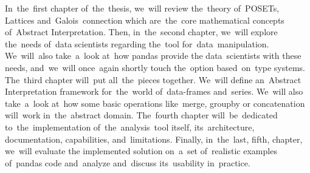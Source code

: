In~the~first chapter of~the~thesis, we~will review the~theory of~POSETs, Lattices and~Galois~connection which
are~the~core mathematical concepts of~Abstract Interpretation.
Then, in~the~second chapter, we~will explore the~needs of~data scientists regarding the~tool for~data~manipulation.
We~will~also take~a~look at~how pandas provide the data~scientists with these needs, and~we~will once~again shortly touch
the~option based~on~type systems.
The~third chapter will~put all~the~pieces together.
We~will define an~Abstract Interpretation framework for~the~world of~data-frames and~series.
We~will also take~a~look at~how some basic operations like~merge, groupby or concatenation will~work in~the~abstract domain.
The~fourth chapter will~be~dedicated to~the~implementation of~the~analysis~tool itself, its~architecture, documentation,
capabilities, and~limitations.
Finally, in~the~last, fifth, chapter, we~will evaluate the implemented solution on~a~set of~realistic examples of~pandas
code and~analyze and~discuss its~usability in~practice.
